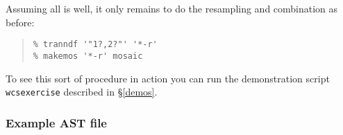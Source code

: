 \documentclass[twoside,11pt]{article}
\newcommand{\hyperref}[4]{#2\ref{#4}#3}
\renewcommand{\_}{\texttt{\symbol{95}}}
\newenvironment{myquote}{\begin{quote}\begin{small}}{\end{small}\end{quote}}
\begin{document}
Assuming all is well, it only remains to do the resampling and
combination as before:
\begin{myquote}
\begin{verbatim}
% tranndf '"1?,2?"' '*-r'
% makemos '*-r' mosaic
\end{verbatim}
\end{myquote}

To see this sort of procedure in action you can run the
demonstration script
\hyperref{{\tt wcsexercise}}{{\tt wcsexercise} described in \S}{}{demos}.



\subsubsection{Example AST file}
\end{document}
